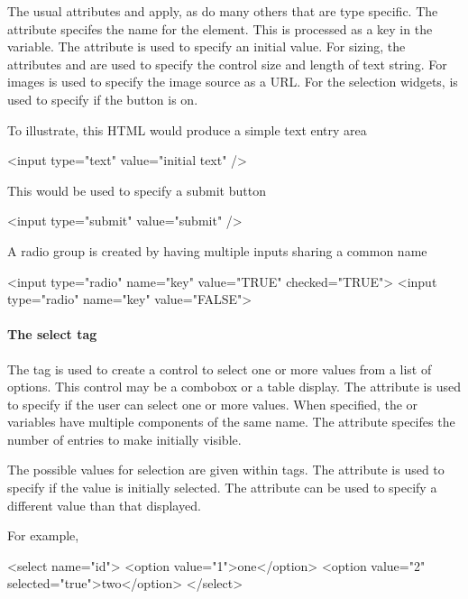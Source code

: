 The usual attributes  and 
apply, as do many others that are type specific.
The  attribute specifes the name for the
element. This is processed as a key in the  variable. The
 attribute is used to specify an initial value. For sizing, the
attributes  and  are used to
specify the control size and length of text string. For images
 is used to specify the image source as a URL. For
the selection widgets,  is used to specify if the
button is on. 

To illustrate, this HTML would produce a simple text entry area
\begin{HTMLinput}
<input type="text" value="initial text" />
\end{HTMLinput}
This would be used to specify a submit button
\begin{HTMLinput}
<input type="submit" value="submit" />
\end{HTMLinput}

A radio group is created by having multiple inputs sharing a common name
\begin{HTMLinput}
<input type="radio" name="key" value="TRUE" checked="TRUE">
<input type="radio" name="key" value="FALSE">
\end{HTMLinput}


\paragraph{The select tag}
The  tag is used to create a control to select one or more
values from a list of options. This control may be a combobox or a
table display. The attribute
 is used to specify if the user can select
one or more values. When specified, the  or  variables
have multiple components of the same name. The 
attribute specifes the number of entries to make initially visible. 

The possible values for selection are given within 
tags. The attribute  is used to specify if
the value is initially selected. The attribute
 can be used to specify a different value than
that displayed.

For example, 
\begin{HTMLinput}
<select name="id">
  <option value="1">one</option>
  <option value="2" selected="true">two</option>
</select>
\end{HTMLinput}

